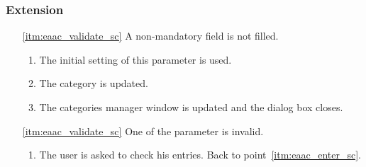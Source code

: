 \subsubsection{Extension}
\begin{enumerate}
	\item[\ref{itm:eaac_validate_sc}] A non-mandatory field is not filled.
	\begin{enumerate}[i]
		\item The initial setting of this parameter is used. 
		\item The category is updated.
		\item The categories manager window is updated and the dialog box closes.
	\end{enumerate}
	
	\item[\ref{itm:eaac_validate_sc}] One of the parameter is invalid.
	\begin{enumerate}[i]
		\item The user is asked to check his entries. Back to point~\ref{itm:eaac_enter_sc}.
	\end{enumerate}
\end{enumerate}